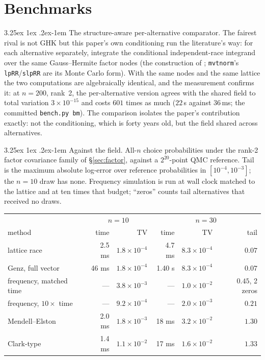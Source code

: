 \documentclass[11pt]{article}
\makeatletter
\renewcommand\paragraph{\@startsection{paragraph}{4}{\z@}%
  {3.25ex \@plus1ex \@minus.2ex}{-1em}%
  {\normalfont\normalsize\itshape}}
\makeatother
\begin{document}
\section{Benchmarks}\label{sec:num}

\paragraph{The structure-aware per-alternative comparator.} The fairest
rival is not GHK but this paper's own conditioning run the literature's
way: for each alternative separately, integrate the conditional
independent-race integrand over the same Gauss--Hermite factor nodes
(the construction of \citet{butler1982}; \texttt{mvtnorm}'s
\texttt{lpRR}/\texttt{slpRR} are its Monte Carlo form). With the same
nodes and the same lattice the two computations are algebraically
identical, and the measurement
confirms it: at $n=200$, rank~2, the per-alternative
version agrees with the shared field to total variation
$3\times10^{-15}$ and costs $601$ times as much ($22$\,s against
$36$\,ms; the committed \texttt{bench.py bm}). The comparison isolates
the paper's contribution exactly: not the conditioning, which is forty
years old, but the field shared across alternatives.

\paragraph{Against the field.} All-$n$ choice probabilities under the rank-2
factor covariance family of \S\ref{sec:factor}, against a
$2^{20}$-point QMC reference. Tail is the maximum absolute log-error over
reference probabilities in $[10^{-4},10^{-3}]$; the $n=10$ draw has none.
Frequency simulation is run at wall clock matched to the lattice and at ten
times that budget; ``zeros'' counts tail alternatives that received no draws.

\begin{center}\small
\begin{tabular}{lrrrrr}
\toprule
& \multicolumn{2}{c}{$n=10$} & \multicolumn{3}{c}{$n=30$}\\
method & time & TV & time & TV & tail\\
\midrule
lattice race & 2.5 ms & $1.8\times10^{-4}$ & 4.7 ms & $8.3\times10^{-4}$ & $0.07$\\
Genz, full vector & 46 ms & $1.8\times10^{-4}$ & 1.40 s & $8.3\times10^{-4}$ & $0.07$\\
frequency, matched time & --- & $3.8\times10^{-3}$ & --- & $1.0\times10^{-2}$ & $0.45$, 2 zeros\\
frequency, $10\times$ time & --- & $9.2\times10^{-4}$ & --- & $2.0\times10^{-3}$ & $0.21$\\
Mendell--Elston & 2.0 ms & $1.8\times10^{-3}$ & 18 ms & $3.2\times10^{-2}$ & $1.30$\\
Clark-type & 1.4 ms & $1.1\times10^{-2}$ & 17 ms & $1.6\times10^{-2}$ & $1.33$\\
\bottomrule
\end{tabular}
\end{center}
\end{document}
